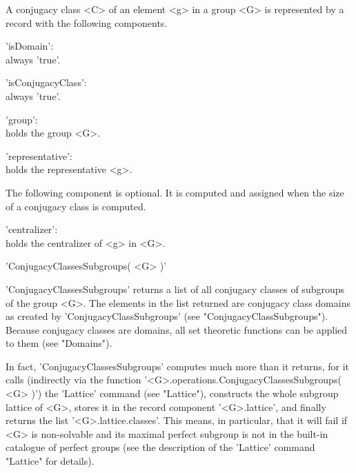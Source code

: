 
A conjugacy class <C> of an element <g> in a group <G> is represented  by
a record with the following components.

'isDomain': \\
        always 'true'.

'isConjugacyClass': \\
        always 'true'.

'group': \\
        holds the group <G>.

'representative': \\
        holds the representative <g>.

The  following component  is optional.  It is computed and assigned  when
the size of a conjugacy class is computed.

'centralizer': \\
        holds the centralizer of <g> in <G>.


'ConjugacyClassesSubgroups( <G> )'

'ConjugacyClassesSubgroups'  returns a list of  all  conjugacy classes of
subgroups  of the group  <G>.   The  elements in   the list returned  are
conjugacy class   domains  as created  by 'ConjugacyClassSubgroups'  (see
"ConjugacyClassSubgroups").   Because conjugacy  classes are domains, all
set theoretic functions can be applied to them (see "Domains").

In fact, 'ConjugacyClassesSubgroups' computes much  more than it returns,
for      it     calls       (indirectly       via        the     function
'<G>.operations.ConjugacyClassesSubgroups( <G>  )') the 'Lattice' command
(see "Lattice"), constructs the whole subgroup lattice  of <G>, stores it
in the  record component '<G>.lattice',   and  finally returns the   list
'<G>.lattice.classes'. This means, in particular,   that it will fail  if
<G>  is non-solvable  and  its maximal  perfect  subgroup  is not in  the
built-in catalogue    of  perfect groups (see   the   description  of the
'Lattice' command "Lattice" for details).

